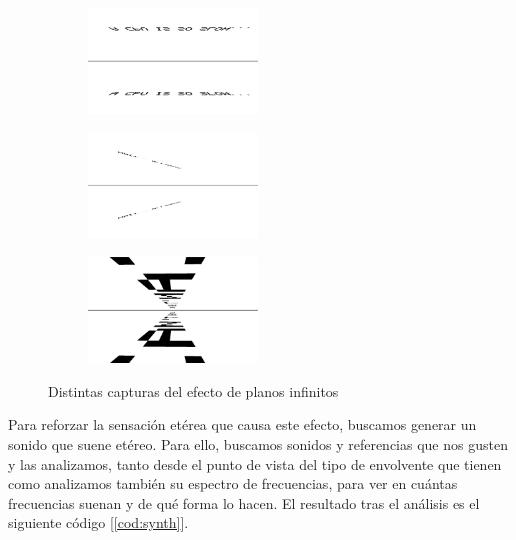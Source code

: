 \begin{figure}[h]
	\centering
	\begin{subfigure}[b]{0.3\textwidth}
		\centering
		\includegraphics[width=4.5cm]{archivos/planes4}
	\end{subfigure}
	\begin{subfigure}[b]{0.3\textwidth}
		\centering
		\includegraphics[width=4.5cm]{archivos/planes5}
	\end{subfigure}
	\begin{subfigure}[b]{0.3\textwidth}
		\centering
		\includegraphics[width=4.5cm]{archivos/planes6}
	\end{subfigure}
	\caption{Distintas capturas del efecto de planos infinitos}
	\label{fig:heaven}
\end{figure}

Para reforzar la sensación etérea que causa este efecto, buscamos generar un sonido que suene etéreo. Para ello, buscamos sonidos y referencias que nos gusten y las analizamos, tanto desde el punto de vista del tipo de envolvente que tienen como analizamos también su espectro de frecuencias, para ver en cuántas frecuencias suenan y de qué forma lo hacen. El resultado tras el análisis es el siguiente código [\ref{cod:synth}].\\

